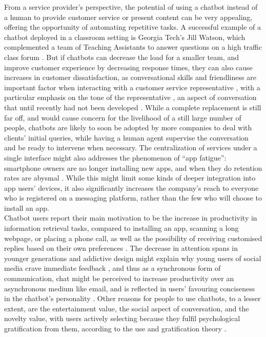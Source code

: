 From a service provider's perspective, the potential of using a chatbot instead of a human to provide customer service or present content can be very appealing, offering the opportunity of automating repetitive tasks. A successful example of a chatbot deployed in a classroom setting is Georgia Tech's Jill Watson, which complemented a team of Teaching Assistants to answer questions on a high traffic class forum \cite{Eicher2016}. But if chatbots can decrease the load for a smaller team, and improve customer experience by decreasing response times, they can also cause increases in customer dissatisfaction, as conversational skills and friendliness are important factor when interacting with a customer service representative \cite{Kang2013}, with a particular emphasis on the tone of the representative \cite{morris1988many}, an aspect of conversation that until recently had not been developed \cite{Hu2018}. While a complete replacement is still far off, and would cause concern for the livelihood of a still large number of people, chatbots are likely to soon be adopted by more companies to deal with clients' initial queries, while having a human agent supervise the conversation and be ready to intervene when necessary. The centralization of services under a single interface might also addresses the phenomenon of ``app fatigue'': smartphone owners are no longer installing new apps, and when they do retention rates are abysmal \cite{appfatigue}. While this might limit some kinds of deeper integration into app users' devices, it also significantly increases the company's reach to everyone who is registered on a messaging platform, rather than the few who will choose to install an app. \\ 
Chatbot users report their main motivation to be the increase in productivity in information retrieval tasks, compared to installing an app, scanning a long webpage, or placing a phone call, as well as the possibility of receiving customised replies based on their own preferences \cite{10.1007/978-3-319-70284-1_30}. The decrease in attention spans in younger generations \cite{Wilmer2017} and addictive design might explain why young users of social media crave immediate feedback \cite{brandtzaeg2016should}, and thus as a synchronous form of communication, chat might be perceived to increase productivity over an asynchronous medium like email, and is reflected in users' favouring conciseness in the chatbot's personality \cite{10.1007/978-3-319-67744-6_28}. Other reasons for people to use chatbots, to a lesser extent, are the entertainment value, the social aspect of conversation, and the novelty value, with users actively selecting because they fulfil psychological gratification from them, according to the use and gratification theory \cite{10.1007/978-3-319-70284-1_30}. \\
